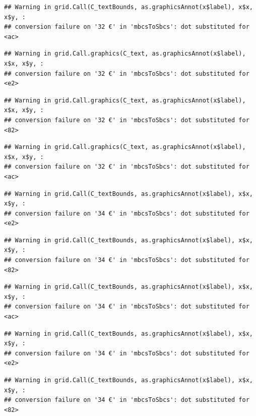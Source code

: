 \documentclass[
]{article}
\begin{document}
\begin{verbatim}
## Warning in grid.Call(C_textBounds, as.graphicsAnnot(x$label), x$x, x$y, :
## conversion failure on '32 €' in 'mbcsToSbcs': dot substituted for <ac>
\end{verbatim}

\begin{verbatim}
## Warning in grid.Call.graphics(C_text, as.graphicsAnnot(x$label), x$x, x$y, :
## conversion failure on '32 €' in 'mbcsToSbcs': dot substituted for <e2>
\end{verbatim}

\begin{verbatim}
## Warning in grid.Call.graphics(C_text, as.graphicsAnnot(x$label), x$x, x$y, :
## conversion failure on '32 €' in 'mbcsToSbcs': dot substituted for <82>
\end{verbatim}

\begin{verbatim}
## Warning in grid.Call.graphics(C_text, as.graphicsAnnot(x$label), x$x, x$y, :
## conversion failure on '32 €' in 'mbcsToSbcs': dot substituted for <ac>
\end{verbatim}

\begin{verbatim}
## Warning in grid.Call(C_textBounds, as.graphicsAnnot(x$label), x$x, x$y, :
## conversion failure on '34 €' in 'mbcsToSbcs': dot substituted for <e2>
\end{verbatim}

\begin{verbatim}
## Warning in grid.Call(C_textBounds, as.graphicsAnnot(x$label), x$x, x$y, :
## conversion failure on '34 €' in 'mbcsToSbcs': dot substituted for <82>
\end{verbatim}

\begin{verbatim}
## Warning in grid.Call(C_textBounds, as.graphicsAnnot(x$label), x$x, x$y, :
## conversion failure on '34 €' in 'mbcsToSbcs': dot substituted for <ac>
\end{verbatim}

\begin{verbatim}
## Warning in grid.Call(C_textBounds, as.graphicsAnnot(x$label), x$x, x$y, :
## conversion failure on '34 €' in 'mbcsToSbcs': dot substituted for <e2>
\end{verbatim}

\begin{verbatim}
## Warning in grid.Call(C_textBounds, as.graphicsAnnot(x$label), x$x, x$y, :
## conversion failure on '34 €' in 'mbcsToSbcs': dot substituted for <82>
\end{verbatim}
\end{document}
